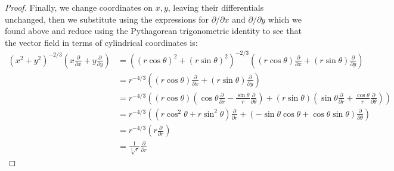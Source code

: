 \documentclass{article}
\begin{document}
\begin{enumerate}
\begin{proof}
		Finally, we change coordinates on $x,y$, leaving their differentials unchanged, then we substitute using the expressions for $\partial/ \partial x$ and $\partial/ \partial y$ which we found above and reduce using the Pythagorean trigonometric identity to see that the vector field in terms of cylindrical coordinates is:
%		
		\begin{align*}
			(x^2+y^2)^{-2/3} \left ( x \frac{\partial}{\partial x} + y \frac{\partial}{\partial y} \right) 
			&=  ((r \cos \theta)^2+(r \sin \theta)^2)^{-2/3} \left ( (r \cos \theta) \frac{\partial}{\partial x} + (r \sin \theta) \frac{\partial}{\partial y} \right) \\
			&= r^{-4/3} \left ( (r \cos \theta) \frac{\partial}{\partial x} + (r \sin \theta) \frac{\partial}{\partial y} \right) \\
			&=  r^{-4/3} \left ( (r \cos \theta)\left(\cos \theta  \frac{\partial }{\partial r}  - \frac{\sin \theta}{r}\frac{\partial }{\partial \theta} \right) + (r \sin \theta)\left ( \sin \theta \frac{\partial}{\partial r} + \frac{\cos \theta}{r} \frac{\partial}{\partial \theta} \right ) \right) \\
			&= r^{-4/3} \left ( (r \cos^2 \theta + r \sin^2 \theta) \frac{\partial}{\partial r} + ( - \sin \theta \cos \theta + \cos \theta \sin \theta ) \frac{\partial}{\partial \theta} \right) \\
			&= r^{-4/3} \left ( r \frac{\partial}{\partial r}  \right)\\
			&= \frac{1}{\sqrt[3]{r}} \frac{\partial}{\partial r} 
			\end{align*}
	\end{proof}
	
\end{enumerate}
\end{document}
